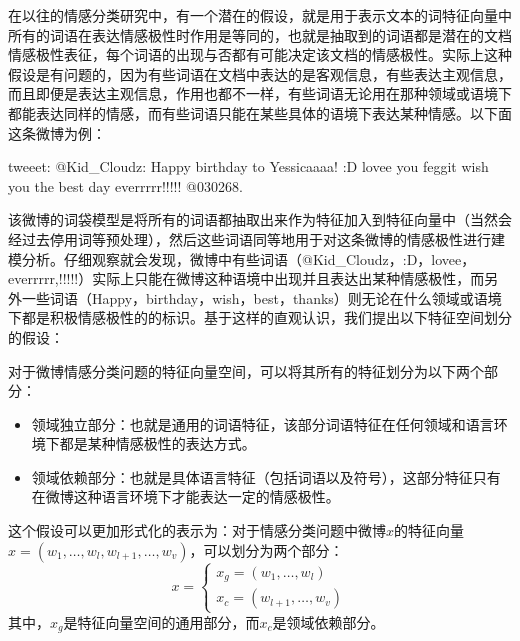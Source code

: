 在以往的情感分类研究中，有一个潜在的假设，就是用于表示文本的词特征向量中所有的词语在表达情感极性时作用是等同的，也就是抽取到的词语都是潜在的文档情感极性表征，每个词语的出现与否都有可能决定该文档的情感极性。实际上这种假设是有问题的，因为有些词语在文档中表达的是客观信息，有些表达主观信息，而且即便是表达主观信息，作用也都不一样，有些词语无论用在那种领域或语境下都能表达同样的情感，而有些词语只能在某些具体的语境下表达某种情感。以下面这条微博为例：

\begin{description}
\item{tweeet:} @Kid\_Cloudz: Happy birthday to Yessicaaaa! :D lovee you feggit wish you the best day everrrrr!!!!! @030268.
\end{description}

该微博的词袋模型是将所有的词语都抽取出来作为特征加入到特征向量中（当然会经过去停用词等预处理），然后这些词语同等地用于对这条微博的情感极性进行建模分析。仔细观察就会发现，微博中有些词语（@Kid\_Cloudz，:D，lovee，everrrrr,!!!!!）实际上只能在微博这种语境中出现并且表达出某种情感极性，而另外一些词语（Happy，birthday，wish，best，thanks）则无论在什么领域或语境下都是积极情感极性的的标识。基于这样的直观认识，我们提出以下特征空间划分的假设：
\begin{hypothesis}[特征空间划分假设]
\label{hy4-1}
对于微博情感分类问题的特征向量空间，可以将其所有的特征划分为以下两个部分：
\begin{itemize}
\item 领域独立部分：也就是通用的词语特征，该部分词语特征在任何领域和语言环境下都是某种情感极性的表达方式。
\item 领域依赖部分：也就是具体语言特征（包括词语以及符号），这部分特征只有在微博这种语言环境下才能表达一定的情感极性。
\end{itemize}
\end{hypothesis}
这个假设可以更加形式化的表示为：对于情感分类问题中微博$ x $的特征向量$ x=\left(  w_{1},\dots,w_{l},w_{l+1},\dots,w_{v} \right) $，可以划分为两个部分：
\begin{equation}
\label{e2}
x=\begin{cases}
x_{g}= \left( w_{1},\dots,w_{l}\right)\\
x_{c}= \left( w_{l+1},\dots,w_{v}\right)
\end{cases}
\end{equation}
其中，$ x_{g} $是特征向量空间的通用部分，而$ x_{c} $是领域依赖部分。

